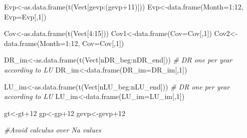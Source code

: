 \documentclass[
  10pt,
  b5paper,
]{book}
\newenvironment{Shaded}{\begin{snugshade}}{\end{snugshade}}
\newcommand{\AttributeTok}[1]{\textcolor[rgb]{0.77,0.63,0.00}{#1}}
\newcommand{\CommentTok}[1]{\textcolor[rgb]{0.56,0.35,0.01}{\textit{#1}}}
\newcommand{\DecValTok}[1]{\textcolor[rgb]{0.00,0.00,0.81}{#1}}
\newcommand{\FunctionTok}[1]{\textcolor[rgb]{0.00,0.00,0.00}{#1}}
\newcommand{\NormalTok}[1]{#1}
\newcommand{\OtherTok}[1]{\textcolor[rgb]{0.56,0.35,0.01}{#1}}
\newcommand{\SpecialCharTok}[1]{\textcolor[rgb]{0.00,0.00,0.00}{#1}}
\begin{document}
\begin{Shaded}
\begin{Highlighting}[]
\NormalTok{Evp}\OtherTok{\textless{}{-}}\FunctionTok{as.data.frame}\NormalTok{(}\FunctionTok{t}\NormalTok{(Vect[gevp}\SpecialCharTok{:}\NormalTok{(gevp}\SpecialCharTok{+}\DecValTok{11}\NormalTok{)]))}
\NormalTok{Evp}\OtherTok{\textless{}{-}}\FunctionTok{data.frame}\NormalTok{(}\AttributeTok{Month=}\DecValTok{1}\SpecialCharTok{:}\DecValTok{12}\NormalTok{, }\AttributeTok{Evp=}\NormalTok{Evp[,}\DecValTok{1}\NormalTok{])}
    
\NormalTok{Cov}\OtherTok{\textless{}{-}}\FunctionTok{as.data.frame}\NormalTok{(}\FunctionTok{t}\NormalTok{(Vect[}\DecValTok{4}\SpecialCharTok{:}\DecValTok{15}\NormalTok{]))}
\NormalTok{Cov1}\OtherTok{\textless{}{-}}\FunctionTok{data.frame}\NormalTok{(}\AttributeTok{Cov=}\NormalTok{Cov[,}\DecValTok{1}\NormalTok{])}
\NormalTok{Cov2}\OtherTok{\textless{}{-}}\FunctionTok{data.frame}\NormalTok{(}\AttributeTok{Month=}\DecValTok{1}\SpecialCharTok{:}\DecValTok{12}\NormalTok{, }\AttributeTok{Cov=}\NormalTok{Cov[,}\DecValTok{1}\NormalTok{])}

\NormalTok{DR\_im}\OtherTok{\textless{}{-}}\FunctionTok{as.data.frame}\NormalTok{(}\FunctionTok{t}\NormalTok{(Vect[nDR\_beg}\SpecialCharTok{:}\NormalTok{nDR\_end])) }\CommentTok{\# DR one per year according to LU}
\NormalTok{DR\_im}\OtherTok{\textless{}{-}}\FunctionTok{data.frame}\NormalTok{(}\AttributeTok{DR\_im=}\NormalTok{DR\_im[,}\DecValTok{1}\NormalTok{])}

\NormalTok{LU\_im}\OtherTok{\textless{}{-}}\FunctionTok{as.data.frame}\NormalTok{(}\FunctionTok{t}\NormalTok{(Vect[nLU\_beg}\SpecialCharTok{:}\NormalTok{nLU\_end])) }\CommentTok{\# DR one per year according to LU}
\NormalTok{LU\_im}\OtherTok{\textless{}{-}}\FunctionTok{data.frame}\NormalTok{(}\AttributeTok{LU\_im=}\NormalTok{LU\_im[,}\DecValTok{1}\NormalTok{])}

\NormalTok{gt}\OtherTok{\textless{}{-}}\NormalTok{gt}\SpecialCharTok{+}\DecValTok{12}
\NormalTok{gp}\OtherTok{\textless{}{-}}\NormalTok{gp}\SpecialCharTok{+}\DecValTok{12}
\NormalTok{gevp}\OtherTok{\textless{}{-}}\NormalTok{gevp}\SpecialCharTok{+}\DecValTok{12}

\CommentTok{\#Avoid calculus over Na values }


\end{Highlighting}
\end{Shaded}
\end{document}

